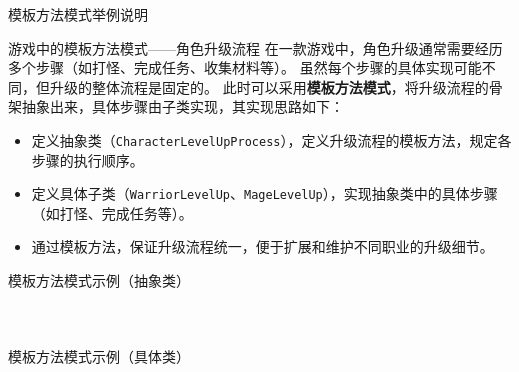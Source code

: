 \documentclass[UTF8,aspectratio=169]{beamer}
\begin{document}
\begin{frame}{模板方法模式举例说明}
    \begin{exampleytublock}{游戏中的模板方法模式——角色升级流程}
        在一款游戏中，角色升级通常需要经历多个步骤（如打怪、完成任务、收集材料等）。
        虽然每个步骤的具体实现可能不同，但升级的整体流程是固定的。
        此时可以采用\textbf{模板方法模式}，将升级流程的骨架抽象出来，具体步骤由子类实现，其实现思路如下：
        \begin{itemize}
            \item 定义抽象类（\texttt{CharacterLevelUpProcess}），定义升级流程的模板方法，规定各步骤的执行顺序。
            \item 定义具体子类（\texttt{WarriorLevelUp}、\texttt{MageLevelUp}），实现抽象类中的具体步骤（如打怪、完成任务等）。
            \item 通过模板方法，保证升级流程统一，便于扩展和维护不同职业的升级细节。
        \end{itemize}
    \end{exampleytublock}
\end{frame}

\begin{frame}{模板方法模式示例（抽象类）}
    \begin{columns}
        \begin{column}{0.48\textwidth}
            \inputminted[firstline=6, lastline=24]{cpp}{code/template_method_pattern.cpp}
        \end{column}
        \begin{column}{0.48\textwidth}
            \inputminted[firstline=26, lastline=41]{cpp}{code/template_method_pattern.cpp}
        \end{column}
    \end{columns}
\end{frame}

\begin{frame}{模板方法模式示例（具体类）}
    \begin{columns}
        \begin{column}{0.48\textwidth}
            \inputminted[firstline=43, lastline=58]{cpp}{code/template_method_pattern.cpp}
        \end{column}
        \begin{column}{0.48\textwidth}
            \inputminted[firstline=60, lastline=73]{cpp}{code/template_method_pattern.cpp}
        \end{column}
    \end{columns}
\end{frame}
\end{document}
